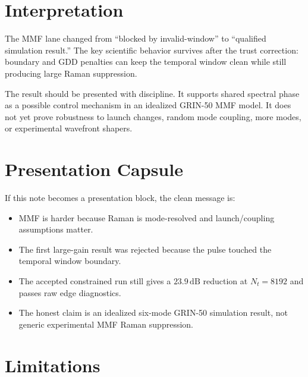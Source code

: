 \documentclass[11pt]{article}
\begin{document}
\FloatBarrier

\section{Interpretation}

The MMF lane changed from ``blocked by invalid-window'' to ``qualified
simulation result.'' The key scientific behavior survives after the trust
correction: boundary and GDD penalties can keep the temporal window clean while
still producing large Raman suppression.

The result should be presented with discipline. It supports shared spectral
phase as a possible control mechanism in an idealized GRIN-50 MMF model. It
does not yet prove robustness to launch changes, random mode coupling, more
modes, or experimental wavefront shapers.

\section{Presentation Capsule}

If this note becomes a presentation block, the clean message is:
\begin{itemize}
    \item MMF is harder because Raman is mode-resolved and launch/coupling
    assumptions matter.
    \item The first large-gain result was rejected because the pulse touched
    the temporal window boundary.
    \item The accepted constrained run still gives a \(23.9\,\mathrm{dB}\)
    reduction at \(N_t=8192\) and passes raw edge diagnostics.
    \item The honest claim is an idealized six-mode GRIN-50 simulation result,
    not generic experimental MMF Raman suppression.
\end{itemize}

\section{Limitations}
\end{document}
